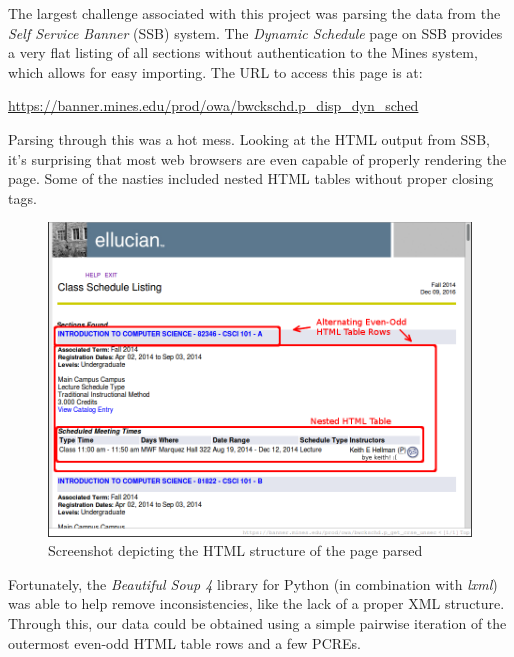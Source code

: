 \documentclass[12pt,letterpaper,titlepage]{article}
\begin{document}
The largest challenge associated with this project was parsing the data from
the \emph{Self Service Banner} (SSB) system. The \emph{Dynamic Schedule} page
on SSB provides a very flat listing of all sections without authentication to
the Mines system, which allows for easy importing. The URL to access this page
is at:

\begin{center}
    \url{https://banner.mines.edu/prod/owa/bwckschd.p_disp_dyn_sched}
\end{center}

Parsing through this was a hot mess. Looking at the HTML output from SSB, it's
surprising that most web browsers are even capable of properly rendering the
page. Some of the nasties included nested HTML tables without proper closing
tags.

\begin{figure}[H]
    \centering
    \includegraphics[width=0.8\linewidth]{bannertbl.png}
    \caption{Screenshot depicting the HTML structure of the page parsed}
\end{figure}

Fortunately, the \emph{Beautiful Soup 4} library for Python (in combination
with \emph{lxml}) was able to help remove inconsistencies, like the lack of a
proper XML structure. Through this, our data could be obtained using a simple
pairwise iteration of the outermost even-odd HTML table rows and a few PCREs.
\end{document}
